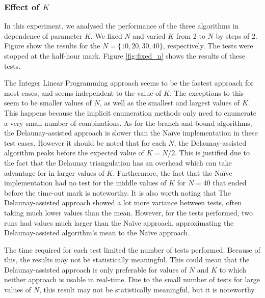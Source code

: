 \subsubsection*{Effect of $K$}
In this experiment, we analysed the performance of the three algorithms in dependence of parameter $K$. We fixed $N$ and varied $K$ from 2 to $N$ by steps of 2. Figure \cite{fig:fixed_n} show the results for the $N=\{10,20,30,40\}$, respectively. The tests were stopped at the half-hour mark. Figure \ref{fig:fixed_n} shows the results of these tests.

\noindent
The Integer Linear Programming approach seems to be the fastest approach for most cases, and seems independent to the value of $K$. The exceptions to this seem to be smaller values of $N$, as well as the smallest and largest values of $K$. This happens because the implicit enumeration methods only need to enumerate a very small number of combinations.
As for the branch-and-bound algorithms, the Delaunay-assisted approach is slower than the Naïve implementation in these test cases. However it should be noted that for each $N$, the Delaunay-assisted algorithm peaks before the expected value of $K=N/2$. This is justified due to the fact that the Delaunay triangulation has an overhead which can take advantage for in larger values of $K$.
Furthermore, the fact that the Naïve implementation had no test for the middle values of $K$ for $N=40$ that ended before the time-out mark is noteworthy.
It is also worth noting that The Delaunay-assisted approach showed a lot more variance between tests, often taking much lower values than the mean. However, for the tests performed, two runs had values much larger than the Naïve approach, approximating the Delaunay-assisted algorithm's mean to the Naïve approach.

The time required for each test limited the number of tests performed. Because of this, the results may not be statistically meaningful. 
This could mean that the Delaunay-assisted approach is only preferable for values of $N$ and $K$ to which neither approach is usable in real-time. Due to the small number of tests for large values of $N$, this result may not be statistically meaningful, but it is noteworthy.

